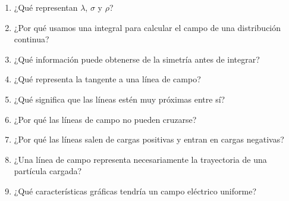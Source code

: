 \begin{enumerate}
    \item ¿Qué representan \(\lambda\), \(\sigma\) y \(\rho\)?

    \item ¿Por qué usamos una integral para calcular el campo de una distribución
    continua?

    \item ¿Qué información puede obtenerse de la simetría antes de integrar?

    \item ¿Qué representa la tangente a una línea de campo?

    \item ¿Qué significa que las líneas estén muy próximas entre sí?

    \item ¿Por qué las líneas de campo no pueden cruzarse?

    \item ¿Por qué las líneas salen de cargas positivas y entran en cargas negativas?

    \item ¿Una línea de campo representa necesariamente la trayectoria de una
    partícula cargada?

    \item ¿Qué características gráficas tendría un campo eléctrico uniforme?
\end{enumerate}



